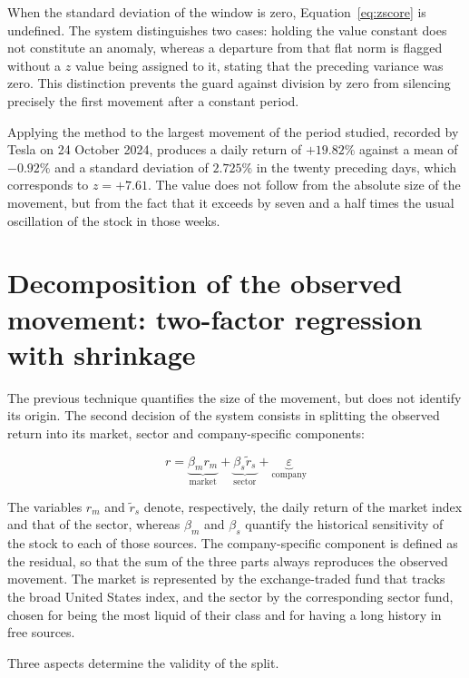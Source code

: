 When the standard deviation of the window is zero, Equation~\ref{eq:zscore} is undefined. The
system distinguishes two cases: holding the value constant does not constitute an anomaly, whereas
a departure from that flat norm is flagged without a $z$ value being assigned to it, stating that
the preceding variance was zero. This distinction prevents the guard against division by zero from
silencing precisely the first movement after a constant period.

Applying the method to the largest movement of the period studied, recorded by Tesla on 24 October
2024, produces a daily return of $+19.82\%$ against a mean of $-0.92\%$ and a standard deviation of
$2.725\%$ in the twenty preceding days, which corresponds to $z = +7.61$. The value does not follow
from the absolute size of the movement, but from the fact that it exceeds by seven and a half times
the usual oscillation of the stock in those weeks.


\section{Decomposition of the observed movement: two-factor regression with shrinkage}
\label{sec:met_decomposicao}

The previous technique quantifies the size of the movement, but does not identify its origin. The
second decision of the system consists in splitting the observed return into its market, sector and
company-specific components:

\begin{equation}
r = \underbrace{\beta_m r_m}_{\text{market}} + \underbrace{\beta_s \tilde{r}_s}_{\text{sector}} + \underbrace{\varepsilon}_{\text{company}}
\label{eq:decomposicao}
\end{equation}

The variables $r_m$ and $\tilde{r}_s$ denote, respectively, the daily return of the market index
and that of the sector, whereas $\beta_m$ and $\beta_s$ quantify the historical sensitivity of the
stock to each of those sources. The company-specific component is defined as the residual, so that
the sum of the three parts always reproduces the observed movement. The market is represented by
the exchange-traded fund that tracks the broad United States index, and the sector by the
corresponding sector fund, chosen for being the most liquid of their class and for having a long
history in free sources.

Three aspects determine the validity of the split.

